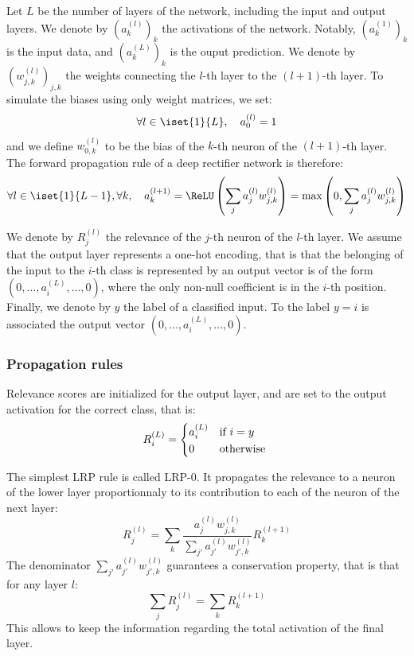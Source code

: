 \documentclass{../cs-classes/cs-classes}
\newcommand*{\1}{\digitsbb{1}}
\newcommand*{\0}{\digitsbb{0}}
\begin{document}
Let $L$ be the number of layers of the network, including the input and output layers. We denote by $\left(a^{(l)}_k\right)_k$ the activations of the network. Notably, $\left(a^{(1)}_k\right)_k$ is the input data, and $\left(a^{(L)}_k\right)_k$ is the ouput prediction. We denote by $\left(w^{(l)}_{j, k}\right)_{j, k}$ the weights connecting the $l$-th layer to the $(l+1)$-th layer. To simulate the biases using only weight matrices, we set:
\begin{equation*}
    \forall l\in\iset{1}{L}, \quad a^{(l)}_0 = 1
\end{equation*}
and we define $w^{(l)}_{0, k}$ to be the bias of the $k$-th neuron of the $(l+1)$-th layer. The forward propagation rule of a deep rectifier network is therefore:
\begin{equation}
    \forall l\in\iset{1}{L-1}, \forall k, \quad a^{(l+1)}_k = \ReLU\left(\sum_{j}a^{(l)}_j w^{(l)}_{j, k}\right) = \max\left(0, \sum_{j}a^{(l)}_j w^{(l)}_{j, k}\right)
\end{equation}

We denote by $R^{(l)}_j$ the relevance of the $j$-th neuron of the $l$-th layer. We assume that the output layer represents a one-hot encoding, that is that the belonging of the input to the $i$-th class is represented by an output vector is of the form $(0, \dots, a^{(L)}_i, \dots, 0)$, where the only non-null coefficient is in the $i$-th position. Finally, we denote by $y$ the label of a classified input. To the label $y=i$ is associated the output vector $(0, \dots, a^{(L)}_i, \dots, 0)$.

\subsubsection{Propagation rules}
Relevance scores are initialized for the output layer, and are set to the output activation for the correct class, that is:
\begin{equation}
    R^{(L)}_i = \begin{cases*}
        a^{(L)}_i & if $i = y$\\
        0 & otherwise
    \end{cases*}
\end{equation}

The simplest LRP rule is called LRP-0. It propagates the relevance to a neuron of the lower layer proportionnaly to its contribution to each of the neuron of the next layer:
\begin{equation}
    R^{(l)}_j = \sum_{k}\frac{a^{(l)}_jw^{(l)}_{j, k}}{\sum_{j'}a^{(l)}_{j'}w^{(l)}_{j', k}} R^{(l+1)}_k
\end{equation}
The denominator $\sum_{j'}a^{(l)}_{j'}w^{(l)}_{j', k}$ guarantees a conservation property, that is that for any layer $l$:
\begin{equation*}
    \sum_j R^{(l)}_j = \sum_k R^{(l+1)}_k
\end{equation*}
This allows to keep the information regarding the total activation of the final layer.
\end{document}

